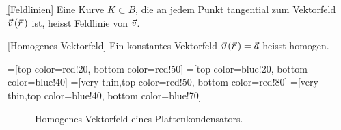 \documentclass[12pt]{article}
\begin{document}
\begin{defn}{\b{[Feldlinien]}}
    Eine Kurve $K\subset{B}$, die an jedem Punkt tangential zum Vektorfeld $\vec{v}\,(\vec{r}\,)$ ist, heisst Feldlinie von $\vec{v}$.
\end{defn}\vspace*{1em}

\begin{defn}{\b{[Homogenes Vektorfeld]}} Ein konstantes Vektorfeld $\vec{v}\,(\vec{r}\,)=\vec{a}$ heisst homogen.
\end{defn}

=[top color=red!20, bottom color=red!50]
=[top color=blue!20, bottom color=blue!40]
=[very thin,top color=red!50, bottom color=red!80]
=[very thin,top color=blue!40, bottom color=blue!70]

\def\dph{0.3} %
\def\dpw{0.1} %
\def\dipole#1{
    \begin{scope}[shift={(#1)}]
        \draw[charge-] (-\dph,0) to[out=90,in=180] (0,\dpw) -- (0,-\dpw) to[out=180,in=-90] cycle;
        \draw[charge+] ( \dph,0) to[out=90,in=0] (0,\dpw) -- (0,-\dpw) to[out=  0,in=-90] cycle;
        \node[scale=0.7] at (-\dph/2,0) {$-$};
        \node[scale=0.7] at ( \dph/2,0) {$+$};
    \end{scope}
}

\def\height{5}
\def\width{3}
\def\platewidth{0.5}
\def\dielwidth{0.13*\width}
\def\nfieldlines{20}
\def\ncharges{7}

\begin{figure}[htbp!]
    \centering
    \caption{Homogenes Vektorfeld eines Plattenkondensators.}
\end{figure}
\end{document}
